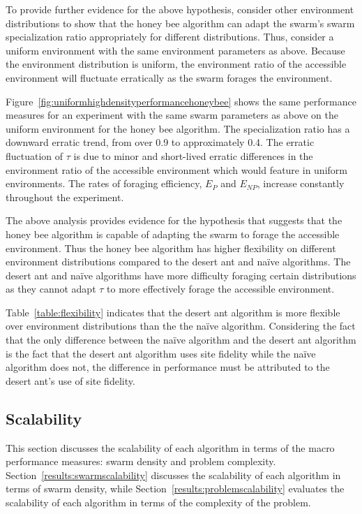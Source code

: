 \documentclass[preprint,12pt]{elsarticle}
\begin{document}
To provide further evidence for the above hypothesis, consider other environment distributions to show that the honey bee algorithm can adapt the swarm's swarm specialization ratio appropriately for different distributions. Thus, consider a uniform environment with the same environment parameters as above. Because the environment distribution is uniform, the environment ratio of the accessible environment will fluctuate erratically as the swarm forages the environment.  

Figure~\ref{fig:uniformhighdensityperformancehoneybee} shows the same performance measures for an experiment with the same swarm parameters as above on the uniform environment for the honey bee algorithm. The specialization ratio has a downward erratic trend, from over 0.9 to approximately 0.4. The erratic fluctuation of $\tau$ is due to minor and short-lived erratic differences in the environment ratio of the accessible environment which would feature in uniform environments. The rates of foraging efficiency, $E_P$ and $E_{NP}$, increase constantly throughout the experiment. 

The above analysis provides evidence for the hypothesis that suggests that the honey bee algorithm is capable of adapting the swarm to forage the accessible environment. Thus the honey bee algorithm has higher flexibility on different environment distributions compared to the desert ant and na\"ive algorithms. The desert ant and na\"ive algorithms have more difficulty foraging certain distributions as they cannot adapt $\tau$ to more effectively forage the accessible environment.

Table~\ref{table:flexibility} indicates that the desert ant algorithm is more flexible over environment distributions than the the na\"ive algorithm. Considering the fact that the only difference between the na\"ive algorithm and the desert ant algorithm is the fact that the desert ant algorithm uses site fidelity while the na\"ive algorithm does not, the difference in performance must be attributed to the desert ant's use of site fidelity. %

\subsection{Scalability}
\label{results:scalability}

This section discusses the scalability of each algorithm in terms of the macro performance measures: swarm density and problem complexity. Section~\ref{results:swarmscalability} discusses the scalability of each algorithm in terms of swarm density, while Section~\ref{results:problemscalability} evaluates the scalability of each algorithm in terms of the complexity of the problem.
\end{document}
